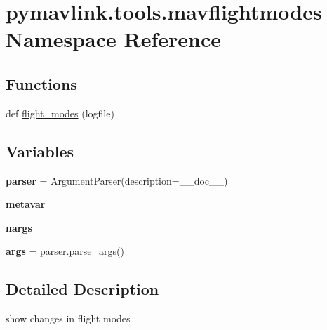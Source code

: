 \hypertarget{namespacepymavlink_1_1tools_1_1mavflightmodes}{}\section{pymavlink.\+tools.\+mavflightmodes Namespace Reference}
\label{namespacepymavlink_1_1tools_1_1mavflightmodes}
\subsection*{Functions}
\begin{DoxyCompactItemize}
\item 
def \hyperlink{namespacepymavlink_1_1tools_1_1mavflightmodes_adb722ae42af4f6a3a13aa8bd170193ee}{flight\+\_\+modes} (logfile)
\end{DoxyCompactItemize}
\subsection*{Variables}
\begin{DoxyCompactItemize}
\item 
\mbox{\label{namespacepymavlink_1_1tools_1_1mavflightmodes_a4e8c10ce50a5690792657671d8f4fc78}} 
{\bfseries parser} = Argument\+Parser(description=\+\_\+\+\_\+doc\+\_\+\+\_\+)
\item 
\mbox{\label{namespacepymavlink_1_1tools_1_1mavflightmodes_a3f6cc982384aa9be3c7f21553c53fa2e}} 
{\bfseries metavar}
\item 
\mbox{\label{namespacepymavlink_1_1tools_1_1mavflightmodes_abbd1eb5fa59b5fcd30ca67fd61d1834b}} 
{\bfseries nargs}
\item 
\mbox{\label{namespacepymavlink_1_1tools_1_1mavflightmodes_a5381f7691451a113ba563a0d769c3352}} 
{\bfseries args} = parser.\+parse\+\_\+args()
\end{DoxyCompactItemize}


\subsection{Detailed Description}
\begin{DoxyVerb}show changes in flight modes
\end{DoxyVerb}
 

